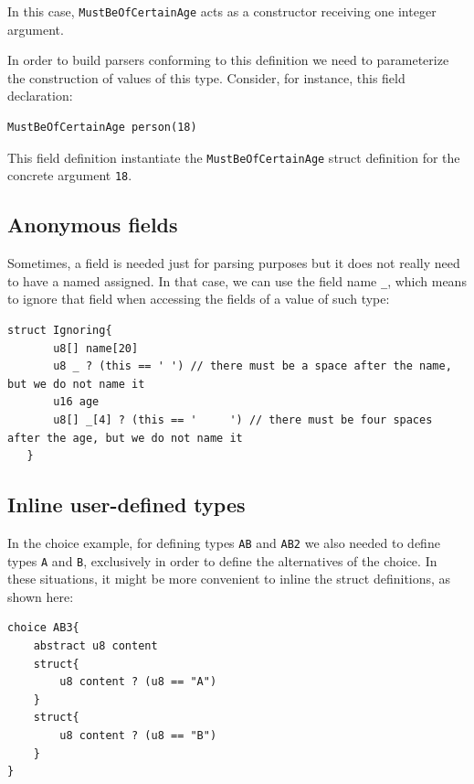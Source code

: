 \documentclass[10pt,oneside]{article}
\begin{document}
In this case, \texttt{MustBeOfCertainAge} acts as a constructor
receiving one integer argument.

In order to build parsers conforming to this definition we need to
parameterize the construction of values of this type. Consider, for
instance, this field declaration:

\begin{verbatim}
MustBeOfCertainAge person(18)
\end{verbatim}

This field definition instantiate the \texttt{MustBeOfCertainAge} struct
definition for the concrete argument \texttt{18}.

\hypertarget{anonymous-fields}{%
\subsection{Anonymous fields}\label{anonymous-fields}}

Sometimes, a field is needed just for parsing purposes but it does not
really need to have a named assigned. In that case, we can use the field
name \texttt{\_}, which means to ignore that field when accessing the
fields of a value of such type:

\begin{verbatim}
struct Ignoring{
       u8[] name[20]
       u8 _ ? (this == ' ') // there must be a space after the name, but we do not name it
       u16 age
       u8[] _[4] ? (this == '     ') // there must be four spaces after the age, but we do not name it
   }
\end{verbatim}

\hypertarget{inline-user-defined-types}{%
\subsection{Inline user-defined types}\label{inline-user-defined-types}}

In the choice example, for defining types \texttt{AB} and \texttt{AB2}
we also needed to define types \texttt{A} and \texttt{B}, exclusively in
order to define the alternatives of the choice. In these situations, it
might be more convenient to inline the struct definitions, as shown
here:

\begin{verbatim}
choice AB3{
    abstract u8 content
    struct{
        u8 content ? (u8 == "A")
    }
    struct{
        u8 content ? (u8 == "B")
    }
}
\end{verbatim}
\end{document}
